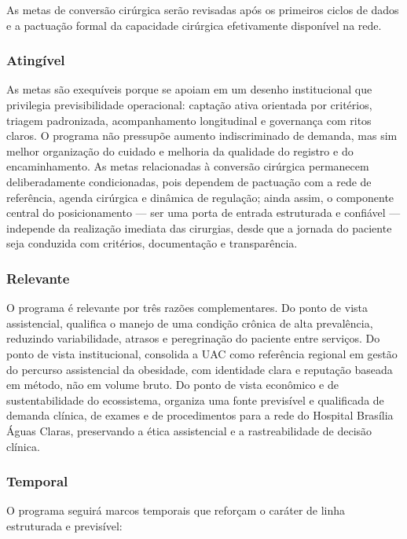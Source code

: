 \documentclass[12pt]{article}
\begin{document}
As metas de conversão cirúrgica serão revisadas após os primeiros ciclos de dados e a pactuação formal da capacidade cirúrgica efetivamente disponível na rede.

\subsubsection{Atingível}
\label{sec:orgf97e8d8}
As metas são exequíveis porque se apoiam em um desenho institucional que privilegia previsibilidade operacional: captação ativa orientada por critérios, triagem padronizada, acompanhamento longitudinal e governança com ritos claros. O programa não pressupõe aumento indiscriminado de demanda, mas sim melhor organização do cuidado e melhoria da qualidade do registro e do encaminhamento. As metas relacionadas à conversão cirúrgica permanecem deliberadamente condicionadas, pois dependem de pactuação com a rede de referência, agenda cirúrgica e dinâmica de regulação; ainda assim, o componente central do posicionamento — ser uma porta de entrada estruturada e confiável — independe da realização imediata das cirurgias, desde que a jornada do paciente seja conduzida com critérios, documentação e transparência.

\subsubsection{Relevante}
\label{sec:orgb7d94d3}
O programa é relevante por três razões complementares. Do ponto de vista assistencial, qualifica o manejo de uma condição crônica de alta prevalência, reduzindo variabilidade, atrasos e peregrinação do paciente entre serviços. Do ponto de vista institucional, consolida a UAC como referência regional em gestão do percurso assistencial da obesidade, com identidade clara e reputação baseada em método, não em volume bruto. Do ponto de vista econômico e de sustentabilidade do ecossistema, organiza uma fonte previsível e qualificada de demanda clínica, de exames e de procedimentos para a rede do Hospital Brasília Águas Claras, preservando a ética assistencial e a rastreabilidade de decisão clínica.

\subsubsection{Temporal}
\label{sec:org0777fc6}
O programa seguirá marcos temporais que reforçam o caráter de linha estruturada e previsível:
\end{document}
